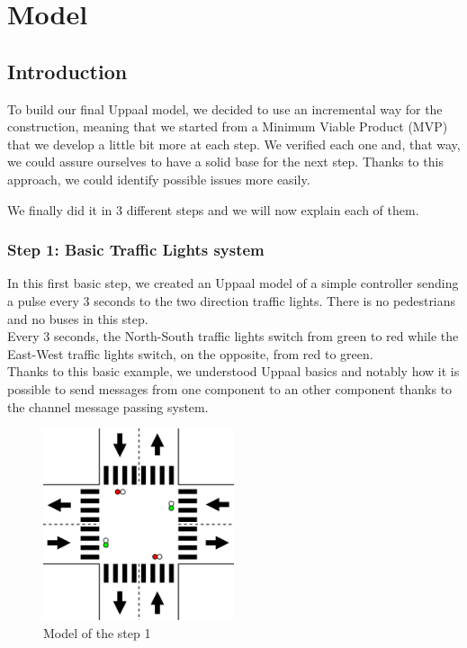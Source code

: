 \section{Model}

\subsection{Introduction}
To build our final Uppaal model, we decided to use an incremental way for the construction, meaning that we started from a Minimum Viable Product (MVP) that we develop a little bit more at each step. We verified each one and, that way, we could assure ourselves to have a solid base for the next step. Thanks to this approach, we could identify possible issues more easily.

We finally did it in 3 different steps and we will now explain each of them.

\subsubsection{Step 1: Basic Traffic Lights system}
In this first basic step, we created an Uppaal model of a simple controller sending a pulse every 3 seconds to the two direction traffic lights. There is no pedestrians and no buses in this step. \\
Every 3 seconds, the North-South traffic lights switch from green to red while the East-West traffic lights switch, on the opposite, from red to green. \\

Thanks to this basic example, we understood Uppaal basics and notably how it is possible to send messages from one component to an other component thanks to the channel message passing system. \\

\begin{figure}[H]\label{fig:step1}
  \centering
    \includegraphics[width=0.5\textwidth]{picture/model/trafficlight_step1_s1.png}
    \caption{Model of the step 1}
\end{figure}

